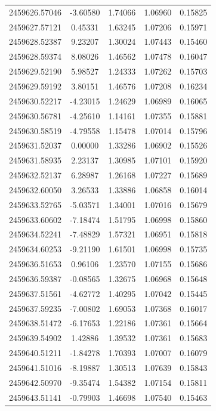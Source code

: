 \documentclass[traditabstract,longauth]{aa}
\begin{document}
\begin{longtable}{lcccc}
2459626.57046 & -3.60580 & 1.74066 & 1.06960 & 0.15825\\
2459627.57121 & 0.45331 & 1.63245 & 1.07206 & 0.15971\\
2459628.52387 & 9.23207 & 1.30024 & 1.07443 & 0.15460\\
2459628.59374 & 8.08026 & 1.46562 & 1.07478 & 0.16047\\
2459629.52190 & 5.98527 & 1.24333 & 1.07262 & 0.15703\\
2459629.59192 & 3.80151 & 1.46576 & 1.07208 & 0.16234\\
2459630.52217 & -4.23015 & 1.24629 & 1.06989 & 0.16065\\
2459630.56781 & -4.25610 & 1.14161 & 1.07355 & 0.15881\\
2459630.58519 & -4.79558 & 1.15478 & 1.07014 & 0.15796\\
2459631.52037 & 0.00000 & 1.33286 & 1.06902 & 0.15526\\
2459631.58935 & 2.23137 & 1.30985 & 1.07101 & 0.15920\\
2459632.52137 & 6.28987 & 1.26168 & 1.07227 & 0.15689\\
2459632.60050 & 3.26533 & 1.33886 & 1.06858 & 0.16014\\
2459633.52765 & -5.03571 & 1.34001 & 1.07016 & 0.15679\\
2459633.60602 & -7.18474 & 1.51795 & 1.06998 & 0.15860\\
2459634.52241 & -7.48829 & 1.57321 & 1.06951 & 0.15818\\
2459634.60253 & -9.21190 & 1.61501 & 1.06998 & 0.15735\\
2459636.51653 & 0.96106 & 1.23570 & 1.07155 & 0.15686\\
2459636.59387 & -0.08565 & 1.32675 & 1.06968 & 0.15648\\
2459637.51561 & -4.62772 & 1.40295 & 1.07042 & 0.15445\\
2459637.59235 & -7.00802 & 1.69053 & 1.07368 & 0.16017\\
2459638.51472 & -6.17653 & 1.22186 & 1.07361 & 0.15664\\
2459639.54902 & 1.42886 & 1.39532 & 1.07361 & 0.15683\\
2459640.51211 & -1.84278 & 1.70393 & 1.07007 & 0.16079\\
2459641.51016 & -8.19887 & 1.30513 & 1.07639 & 0.15843\\
2459642.50970 & -9.35474 & 1.54382 & 1.07154 & 0.15811\\
2459643.51141 & -0.79903 & 1.46698 & 1.07540 & 0.15463\\

\end{longtable}
\end{document}

